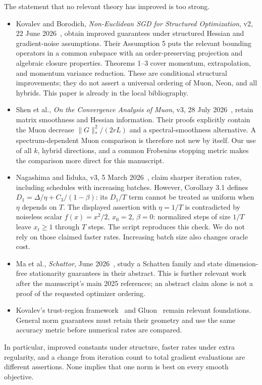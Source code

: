 \documentclass[11pt]{article}
\newcommand{\nuc}[1]{\lVert #1\rVert_*}
\begin{document}
The statement that no relevant theory has improved is too strong.
\begin{itemize}
\item Kovalev and Borodich, \emph{Non-Euclidean SGD for Structured
Optimization}, v2, 22 June 2026~\cite{structured}, obtain improved guarantees
under structured Hessian and gradient-noise assumptions. Their Assumption 5
puts the relevant bounding operators in a common subspace with an
order-preserving projection and algebraic closure properties. Theorems 1--3
cover momentum, extrapolation, and momentum variance reduction. These are
conditional structural improvements; they do not assert a universal ordering
of Muon, Neon, and all hybrids. This paper is already in the local bibliography.
\item Shen et al., \emph{On the Convergence Analysis of Muon}, v3, 28 July
2026~\cite{shen}, retain matrix smoothness and Hessian information. Their
proofs explicitly contain the Muon decrease
$\nuc{G}^2/(2rL)$ and a spectral-smoothness alternative. A spectrum-dependent
Muon comparison is therefore not new by itself. Our use of all $k$, hybrid
directions, and a common Frobenius stopping metric makes the comparison more
direct for this manuscript.
\item Nagashima and Iiduka, v3, 5 March 2026~\cite{nagashima}, claim sharper
iteration rates, including schedules with increasing batches. However,
Corollary 3.1 defines $D_1=\Delta/\eta+C_3/(1-\beta)$: its $D_1/T$ term cannot
be treated as uniform when $\eta$ depends on $T$. The displayed assertion
with $\eta=1/T$ is contradicted by noiseless scalar $f(x)=x^2/2$, $x_0=2$,
$\beta=0$: normalized steps of size $1/T$ leave $x_t\geq1$ through $T$ steps.
The script reproduces this check. We do not rely on those claimed faster
rates. Increasing batch size also changes oracle cost.
\item Ma et al., \emph{Schattor}, June 2026~\cite{schattor}, study a Schatten
family and state dimension-free stationarity guarantees in their abstract.
This is further relevant work after the manuscript's main 2025 references;
an abstract claim alone is not a proof of the requested optimizer ordering.
\item Kovalev's trust-region framework~\cite{trust} and Gluon~\cite{gluon}
remain relevant foundations. General norm guarantees must retain their
geometry and use the same accuracy metric before numerical rates are compared.
\end{itemize}
In particular, improved constants under structure, faster rates under extra
regularity, and a change from iteration count to total gradient evaluations
are different assertions. None implies that one norm is best on every smooth
objective.
\end{document}
